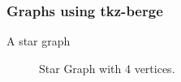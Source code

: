\documentclass[10pt, xcolor=dvipsnames]{beamer}
\begin{document}
\begin{frame}
\frametitle{Graphs using tkz-berge}
A star graph

\begin{figure}


\caption{\label{fig:star_4}Star Graph with 4 vertices.}
\end{figure}

\end{frame}



\end{document}
